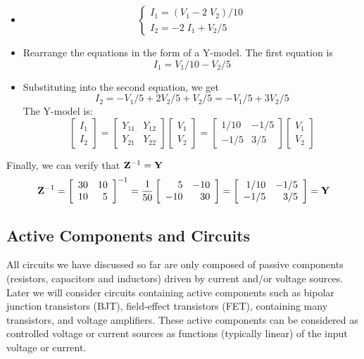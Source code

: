 \begin{itemize}
\begin{itemize}
\item
\[	\left\{ \begin{array}{l} 
	I_1=(V_1-2\;V_2)/10 \\ I_2=-2\;I_1+V_2/5 \end{array} \right. \]
\item Rearrange the equations in the form of a Y-model. The first equation is
\[	I_1=V_1/10-V_2/5	\]
\item Substituting into the second equation, we get
\[	I_2=-V_1/5+2V_2/5+V_2/5=-V_1/5+3V_2/5	\]
The Y-model is:
\[	\left[ \begin{array}{l} I_1 \\ I_2 \end{array} \right]=
	\left[ \begin{array}{rr} Y_{11} & Y_{12} \\ Y_{21} & Y_{22} \end{array} \right]
	\left[ \begin{array}{l} V_1 \\ V_2 \end{array} \right]
=	\left[ \begin{array}{rr} 1/10 & -1/5 \\ -1/5 & 3/5 \end{array} \right]
	\left[ \begin{array}{l} V_1 \\ V_2 \end{array} \right] \]
\end{itemize}
Finally, we can verify that ${\bf Z}^{-1}={\bf Y}$
\[ {\bf Z}^{-1}=\left[ \begin{array}{rr} 30 & 10 \\ 10 & 5 \end{array} \right]^{-1}
	=\frac{1}{50}\left[ \begin{array}{rr} 5 & -10 \\ -10 & 30 \end{array} \right]
	=\left[ \begin{array}{rr} 1/10 & -1/5 \\ -1/5 & 3/5 \end{array} \right]
	={\bf Y}	\]

\subsection*{Active Components and Circuits}

All circuits we have discussed so far are only composed of passive components 
(resistors, capacitors and inductors) driven by current and/or voltage 
sources. Later we will consider circuits containing active components such
as bipolar junction transistors (BJT), field-effect transistors (FET), 
containing many transistors, and voltage amplifiers. These active components
can be considered as controlled voltage or current sources as functions 
(typically linear) of the input voltage or current. 


\end{itemize}
